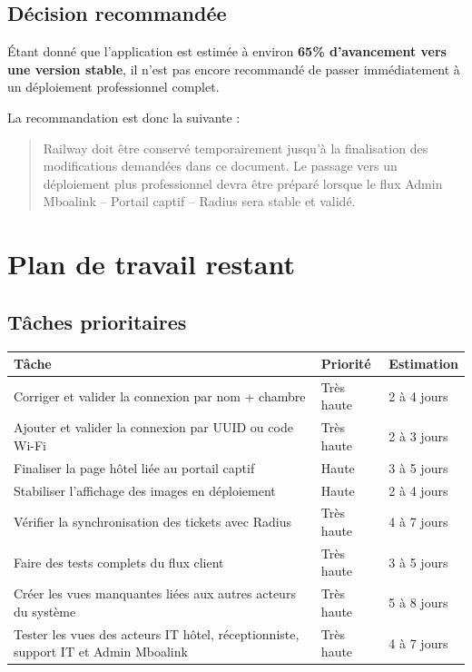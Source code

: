 \documentclass[12pt,a4paper]{article}
\begin{document}
\subsection{Décision recommandée}

Étant donné que l'application est estimée à environ \textbf{65\% d'avancement vers une version stable}, il n'est pas encore recommandé de passer immédiatement à un déploiement professionnel complet.

La recommandation est donc la suivante :

\begin{quote}
Railway doit être conservé temporairement jusqu'à la finalisation des modifications demandées dans ce document. Le passage vers un déploiement plus professionnel devra être préparé lorsque le flux Admin Mboalink -- Portail captif -- Radius sera stable et validé.
\end{quote}

\section{Plan de travail restant}

\subsection{Tâches prioritaires}

\begin{longtable}{|p{7cm}|p{4cm}|p{3cm}|}
\hline
\textbf{Tâche} & \textbf{Priorité} & \textbf{Estimation} \\
\hline
Corriger et valider la connexion par nom + chambre & Très haute & 2 à 4 jours \\
\hline
Ajouter et valider la connexion par UUID ou code Wi-Fi & Très haute & 2 à 3 jours \\
\hline
Finaliser la page hôtel liée au portail captif & Haute & 3 à 5 jours \\
\hline
Stabiliser l'affichage des images en déploiement & Haute & 2 à 4 jours \\
\hline
Vérifier la synchronisation des tickets avec Radius & Très haute & 4 à 7 jours \\
\hline
Faire des tests complets du flux client & Très haute & 3 à 5 jours \\
\hline
Créer les vues manquantes liées aux autres acteurs du système & Très haute & 5 à 8 jours \\
\hline
Tester les vues des acteurs IT hôtel, réceptionniste, support IT et Admin Mboalink & Très haute & 4 à 7 jours \\
\hline
\end{longtable}
\end{document}
